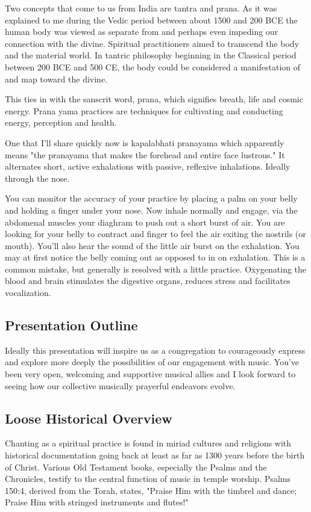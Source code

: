 \documentclass[12pt]{article}
\begin{document}
Two concepts that come to us from India are tantra and prana. As it was explained to me during the Vedic period between about 1500 and 200 BCE the human body was viewed as separate from and perhaps even impeding our connection with the divine. Spiritual practitioners aimed to transcend the body and the material world. In tantric philosophy beginning in the Classical period between 200 BCE and 500 CE, the body could be considered a manifestation of and map toward the divine.

This ties in with the sanscrit word, prana, which signifies breath, life and cosmic energy. Prana yama practices are techniques for cultivating and conducting energy, perception and health.

One that I'll share quickly now is kapalabhati pranayama which apparently means "the pranayama that makes the forehead and entire face lustrous." It alternates short, active exhalations with passive, reflexive inhalations. Ideally through the nose.

You can monitor the accuracy of your practice by placing a palm on your belly and holding a finger under your nose. Now inhale normally and engage, via the abdomenal muscles your diaghram to push out a short burst of air. You are looking for your belly to contract and finger to feel the air exiting the nostrils (or mouth). You'll also hear the sound of the little air burst on the exhalation. You may at first notice the belly coming out as opposed to in on exhalation. This is a common mistake, but generally is resolved with a little practice. Oxygenating the blood and brain stimulates the digestive organs, reduces stress and facilitates vocalization.

\subsection*{Presentation Outline}

Ideally this presentation will inspire us as a congregation to courageously express and explore more deeply the possibilities of our engagement with music. You've been very open, welcoming and supportive musical allies and I look forward to seeing how our collective musically prayerful endeavors evolve.

\subsection*{Loose Historical Overview}

Chanting as a spiritual practice is found in miriad cultures and religions with historical documentation going back at least as far as 1300 years before the birth of Christ. Various Old Testament books, especially the Psalms and the Chronicles, testify to the central function of music in temple worship. Psalms 150:4, derived from the Torah, states, "Praise Him with the timbrel and dance; Praise Him with stringed instruments and flutes!"
\end{document}
